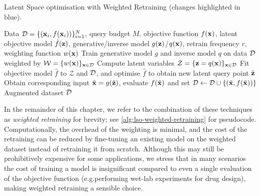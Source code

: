 \begin{algorithm}[tb]
\caption{Latent Space optimisation {\color{blue} with Weighted Retraining} (changes highlighted in {\color{blue} blue}).}
\label{alg:lso-weighted-retraining}
\begin{algorithmic}[1]
     Data $\mathcal{D} = \{(\mathbf{x}_i, f(\mathbf{x}_i))\}_{i=1}^N$, query budget $M$, objective function $f(\mathbf{x})$, latent objective model $\hat f(\mathbf{z})$,
    generative/inverse model $g(\mathbf{z})$/$q(\mathbf{x})$, {\color{blue} retrain frequency $r$, weighting function $w(\mathbf{x})$}
    \vspace{1mm}
    {\color{blue}
        {\color{black} \STATE Train generative model $g$ and inverse model $q$ on data $\mathcal{D}$ {\color{blue} weighted by $\mathcal{W} = \{w(\mathbf{x})\}_{\mathbf{x} \in \mathcal{D}}$}%
        \vspace{1mm}
            \STATE Compute latent variables $\mathcal{Z} = \{\mathbf{z} = q(\mathbf{x})\}_{\mathbf{x} \in \mathcal{D}}$
            \STATE Fit objective model $\hat f$ to $\mathcal{Z}$ and $\mathcal{D}$,
            and optimise $\hat f$
            to obtain new latent query point $\tilde{\mathbf{z}}$
    	    \STATE Obtain corresponding input $\tilde{\mathbf{x}} = g(\tilde{\mathbf{z}})$, evaluate $f(\tilde{\mathbf{x}})$ and set $\mathcal{D} \gets \mathcal{D} \cup \{(\tilde{\mathbf{x}}, f(\tilde{\mathbf{x}}))\}$
        \ENDFOR}
    \ENDFOR}
    \vspace{1mm}
	 Augmented dataset $\mathcal{D}$
\end{algorithmic} 
\end{algorithm}

In the remainder of this chapter, we refer to the combination of these techniques as
\emph{weighted retraining} for brevity; see \cref{alg:lso-weighted-retraining} for pseudocode.
Computationally, the overhead of the weighting is minimal, and the cost of the retraining
can be reduced by fine-tuning an existing model on the weighted dataset instead of retraining it from scratch.
Although this may still be prohibitively expensive for some applications,
we stress that in many scenarios the cost of training a model is insignificant compared to even a single evaluation of the objective function (e.g.\@ performing wet-lab experiments for drug design),
making weighted retraining a sensible choice.
